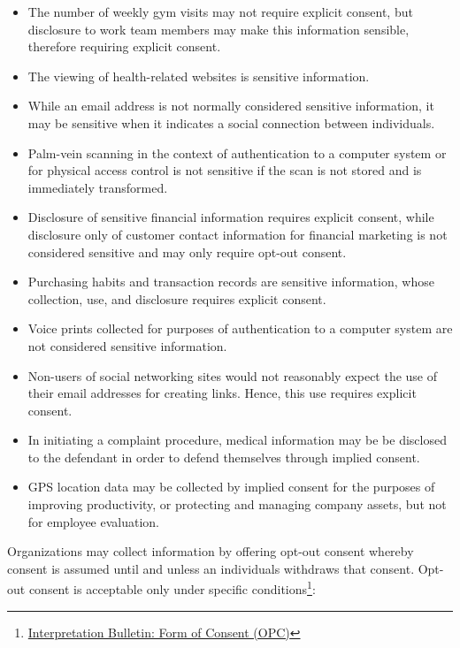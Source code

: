 \begin{itemize}
   \item The number of weekly gym visits may not require explicit consent, but disclosure to work team members may make this information sensible, therefore requiring explicit consent.
   \item The viewing of health-related websites is sensitive information.
   \item While an email address is not normally considered sensitive information, it may be sensitive when it indicates a social connection between individuals.
   \item Palm-vein scanning in the context of authentication to a computer system or for physical access control is not sensitive if the scan is not stored and is immediately transformed.
   \item Disclosure of sensitive financial information requires explicit consent, while disclosure only of customer contact information for financial marketing is not considered sensitive and may only require opt-out consent.
   \item Purchasing habits and transaction records are sensitive information, whose collection, use, and disclosure requires explicit consent.
   \item Voice prints collected for purposes of authentication to a computer system are not considered sensitive information.
   \item Non-users of social networking sites would not reasonably expect the use of their email addresses for creating links. Hence, this use requires explicit consent.
   \item In initiating a complaint procedure, medical information may be be disclosed to the defendant in order to defend themselves through implied consent.
   \item GPS location data may be collected by implied consent for the purposes of improving productivity, or protecting and managing company assets, but not for employee evaluation.
\end{itemize}

Organizations may collect information by offering opt-out consent whereby consent is assumed until and unless an individuals withdraws that consent. Opt-out consent is acceptable only under specific conditions\footnote{\href{https://www.priv.gc.ca/en/privacy-topics/privacy-laws-in-canada/the-personal-information-protection-and-electronic-documents-act-pipeda/pipeda-compliance-help/pipeda-interpretation-bulletins/interpretations_07_consent/}{Interpretation Bulletin: Form of Consent (OPC)}}:

